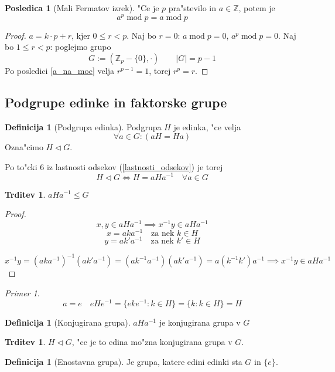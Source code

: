 \documentclass[11pt, a4paper]{article}
\theoremstyle{definition}
\newtheorem{defn}[counter]{Definicija}
\newtheorem{conseq}[counter]{Posledica}
\newtheorem{claim}[counter]{Trditev}
\theoremstyle{remark}
\newtheorem*{ex}{Primer}
\newcommand{\Z}{\mathbb{Z}}
\begin{document}
	\begin{conseq}[Mali Fermatov izrek]
		"Ce je $p$ pra"stevilo in $a \in \Z$, potem je
		\[ a^p \operatorname{mod} p = a \operatorname{mod} p \]
	\end{conseq}
	\begin{proof}
		$a = k \cdot p + r$, kjer $0 \leq r < p$.
		Naj bo $r = 0$: $a \operatorname{mod} p = 0$, $a^p \operatorname{mod} p = 0$.
		Naj bo $1 \leq r < p$: poglejmo grupo
		\[ G := (\Z_p - \lbrace 0 \rbrace, \cdot) \qquad |G| = p-1 \]
		Po posledici \ref{a_na_moc} velja $r^{p-1} = 1$, torej $r^p = r$.
	\end{proof}

	\subsection{Podgrupe edinke in faktorske grupe}
	\begin{defn}[Podgrupa edinka]
		Podgrupa $H$ je edinka, "ce velja
		\[ \forall a \in G: (aH = Ha) \]
		Ozna"cimo $H \triangleleft G$.
	\end{defn}

	Po to"cki 6 iz lastnosti odsekov (\ref{lastnosti_odsekov}) je torej
	\[ H \triangleleft G \iff H = aHa^{-1} \quad \forall a \in G \]
	
	\begin{claim}
		$aHa^{-1} \leq G$
	\end{claim}
	\begin{proof}
		\[ x,y \in aHa^{-1} \implies x^{-1}y \in aHa^{-1} \]
		\[ x = aka^{-1} \quad \text{za nek }k \in H \]
		\[ y = ak'a^{-1} \quad \text{za nek }k' \in H \]
		
		\[x^{-1}y = (aka^{-1})^{-1}(ak'a^{-1}) = (ak^{-1}a^{-1})(ak'a^{-1}) = a(k^{-1}k')a^{-1} \implies x^{-1}y \in aHa^{-1} \]
	\end{proof}

	\begin{ex}
		\[a = e \quad eHe^{-1} = \lbrace eke^{-1}: k\in H \rbrace = \lbrace k: k \in H \rbrace = H \]
	\end{ex}
	
	\begin{defn}[Konjugirana grupa]
		$aHa^{-1}$ je konjugirana grupa v $G$
	\end{defn}
	\begin{claim}
		$H \triangleleft G$, "ce je to edina mo"zna konjugirana grupa v $G$.
	\end{claim}

	\begin{defn}[Enostavna grupa]
		Je grupa, katere edini edinki sta $G$ in $\lbrace e \rbrace$.
	\end{defn}
\end{document}

